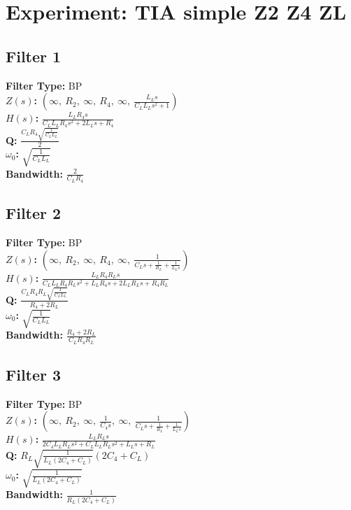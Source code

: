 \documentclass{article}
\begin{document}
        \section*{Experiment: TIA simple Z2 Z4 ZL}
\subsection*{Filter 1}
\textbf{Filter Type:} BP \\ 
\textbf{$Z(s)$:} $\left( \infty, \  R_{2}, \  \infty, \  R_{4}, \  \infty, \  \frac{L_{L} s}{C_{L} L_{L} s^{2} + 1}\right)$ \\ 
\textbf{$H(s)$:} $\frac{L_{L} R_{4} s}{C_{L} L_{L} R_{4} s^{2} + 2 L_{L} s + R_{4}}$ \\ 
\textbf{Q:} $\frac{C_{L} R_{4} \sqrt{\frac{1}{C_{L} L_{L}}}}{2}$ \\ 
\textbf{$\omega_0$:} $\sqrt{\frac{1}{C_{L} L_{L}}}$ \\ 
\textbf{Bandwidth:} $\frac{2}{C_{L} R_{4}}$ \\ 
\subsection*{Filter 2}
\textbf{Filter Type:} BP \\ 
\textbf{$Z(s)$:} $\left( \infty, \  R_{2}, \  \infty, \  R_{4}, \  \infty, \  \frac{1}{C_{L} s + \frac{1}{R_{L}} + \frac{1}{L_{L} s}}\right)$ \\ 
\textbf{$H(s)$:} $\frac{L_{L} R_{4} R_{L} s}{C_{L} L_{L} R_{4} R_{L} s^{2} + L_{L} R_{4} s + 2 L_{L} R_{L} s + R_{4} R_{L}}$ \\ 
\textbf{Q:} $\frac{C_{L} R_{4} R_{L} \sqrt{\frac{1}{C_{L} L_{L}}}}{R_{4} + 2 R_{L}}$ \\ 
\textbf{$\omega_0$:} $\sqrt{\frac{1}{C_{L} L_{L}}}$ \\ 
\textbf{Bandwidth:} $\frac{R_{4} + 2 R_{L}}{C_{L} R_{4} R_{L}}$ \\ 
\subsection*{Filter 3}
\textbf{Filter Type:} BP \\ 
\textbf{$Z(s)$:} $\left( \infty, \  R_{2}, \  \infty, \  \frac{1}{C_{4} s}, \  \infty, \  \frac{1}{C_{L} s + \frac{1}{R_{L}} + \frac{1}{L_{L} s}}\right)$ \\ 
\textbf{$H(s)$:} $\frac{L_{L} R_{L} s}{2 C_{4} L_{L} R_{L} s^{2} + C_{L} L_{L} R_{L} s^{2} + L_{L} s + R_{L}}$ \\ 
\textbf{Q:} $R_{L} \sqrt{\frac{1}{L_{L} \left(2 C_{4} + C_{L}\right)}} \left(2 C_{4} + C_{L}\right)$ \\ 
\textbf{$\omega_0$:} $\sqrt{\frac{1}{L_{L} \left(2 C_{4} + C_{L}\right)}}$ \\ 
\textbf{Bandwidth:} $\frac{1}{R_{L} \left(2 C_{4} + C_{L}\right)}$ \\ 
\end{document}
